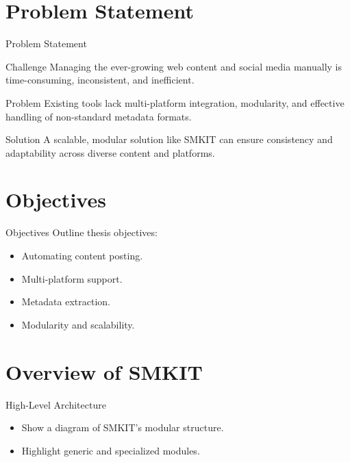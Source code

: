 \documentclass{beamer}
\begin{document}
\section{Problem Statement}
    \begin{frame}{Problem Statement}
        \begin{block}{Challenge}
            Managing the ever-growing web content and social media manually is time-consuming, inconsistent, and inefficient.
        \end{block}

        \vspace{0.5cm}

        \begin{alertblock}{Problem}
            Existing tools lack multi-platform integration, modularity, and effective handling of non-standard metadata formats.
        \end{alertblock}

        \vspace{0.5cm}

        \begin{exampleblock}{Solution}
            A scalable, modular solution like SMKIT can ensure consistency and adaptability across diverse content and platforms.
        \end{exampleblock}
    \end{frame}


\section{Objectives}
    \begin{frame}{Objectives}
        Outline thesis objectives:
        \begin{itemize}
            \item Automating content posting.
            \item Multi-platform support.
            \item Metadata extraction.
            \item Modularity and scalability.
        \end{itemize}
    \end{frame}


\section{Overview of SMKIT}
    \begin{frame}{High-Level Architecture}
        \begin{itemize}
            \item Show a diagram of SMKIT’s modular structure.
            \item Highlight generic and specialized modules.
        \end{itemize}
    \end{frame}
\end{document}
